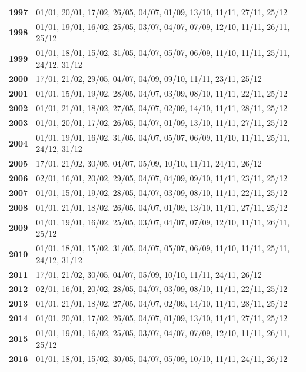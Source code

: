 \documentclass[11pt, english]{article}
\begin{document}
\begin{table}[h]
\begin{center}
\begin{tabular}{p{1cm}p{12cm}}
                        \textbf{1997} & 01/01, 20/01, 17/02, 26/05, 04/07, 01/09, 13/10, 11/11, 27/11, 25/12\\
                        \textbf{1998} & 01/01, 19/01, 16/02, 25/05, 03/07, 04/07, 07/09, 12/10, 11/11, 26/11, 25/12\\
			\textbf{1999} & 01/01, 18/01, 15/02, 31/05, 04/07, 05/07, 06/09, 11/10, 11/11, 25/11, 24/12, 31/12\\    
                        \textbf{2000} & 17/01, 21/02, 29/05, 04/07, 04/09, 09/10, 11/11, 23/11, 25/12\\
                        \textbf{2001} & 01/01, 15/01, 19/02, 28/05, 04/07, 03/09, 08/10, 11/11, 22/11, 25/12\\
                        \textbf{2002} & 01/01, 21/01, 18/02, 27/05, 04/07, 02/09, 14/10, 11/11, 28/11, 25/12\\
                        \textbf{2003} & 01/01, 20/01, 17/02, 26/05, 04/07, 01/09, 13/10, 11/11, 27/11, 25/12\\
                        \textbf{2004} & 01/01, 19/01, 16/02, 31/05, 04/07, 05/07, 06/09, 11/10, 11/11, 25/11, 24/12, 31/12\\
			\textbf{2005} & 17/01, 21/02, 30/05, 04/07, 05/09, 10/10, 11/11, 24/11, 26/12\\
                        \textbf{2006} & 02/01, 16/01, 20/02, 29/05, 04/07, 04/09, 09/10, 11/11, 23/11, 25/12\\
                        \textbf{2007} & 01/01, 15/01, 19/02, 28/05, 04/07, 03/09, 08/10, 11/11, 22/11, 25/12\\
                        \textbf{2008} & 01/01, 21/01, 18/02, 26/05, 04/07, 01/09, 13/10, 11/11, 27/11, 25/12\\
                        \textbf{2009} & 01/01, 19/01, 16/02, 25/05, 03/07, 04/07, 07/09, 12/10, 11/11, 26/11, 25/12\\
                        \textbf{2010} & 01/01, 18/01, 15/02, 31/05, 04/07, 05/07, 06/09, 11/10, 11/11, 25/11, 24/12, 31/12\\
			\textbf{2011} & 17/01, 21/02, 30/05, 04/07, 05/09, 10/10, 11/11, 24/11, 26/12\\
                        \textbf{2012} & 02/01, 16/01, 20/02, 28/05, 04/07, 03/09, 08/10, 11/11, 22/11, 25/12\\
                        \textbf{2013} & 01/01, 21/01, 18/02, 27/05, 04/07, 02/09, 14/10, 11/11, 28/11, 25/12\\
                        \textbf{2014} & 01/01, 20/01, 17/02, 26/05, 04/07, 01/09, 13/10, 11/11, 27/11, 25/12\\
                        \textbf{2015} & 01/01, 19/01, 16/02, 25/05, 03/07, 04/07, 07/09, 12/10, 11/11, 26/11, 25/12\\
                        \textbf{2016} & 01/01, 18/01, 15/02, 30/05, 04/07, 05/09, 10/10, 11/11, 24/11, 26/12\\
			\hline
		\end{tabular}
		\end{center}
		\end{table}
	\newpage
\end{document}
